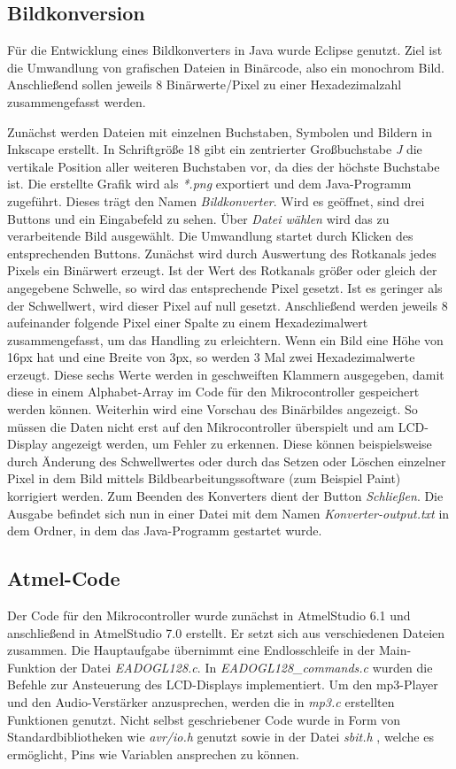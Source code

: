 \documentclass[journal, a4paper]{IEEEtran}
\begin{document}
	\subsection{Bildkonversion}
		\label{sc:Software:subsc:Bildkonverter}
		Für die Entwicklung eines Bildkonverters in Java wurde Eclipse genutzt. Ziel ist die Umwandlung von grafischen Dateien in Binärcode, also ein monochrom Bild. Anschließend sollen jeweils 8 Binärwerte/Pixel zu einer Hexadezimalzahl zusammengefasst werden.\par 
		Zunächst werden Dateien mit einzelnen Buchstaben, Symbolen und Bildern in Inkscape erstellt. In Schriftgröße 18 gibt ein zentrierter Großbuchstabe \textit{J} die vertikale Position aller weiteren Buchstaben vor, da dies der höchste Buchstabe ist. Die erstellte Grafik wird als \textit{*.png} exportiert und dem Java-Programm zugeführt. Dieses trägt den Namen \textit{Bildkonverter}. Wird es geöffnet, sind drei Buttons und ein Eingabefeld zu sehen. Über \textit{Datei wählen} wird das zu verarbeitende Bild ausgewählt. Die Umwandlung startet durch Klicken des entsprechenden Buttons. Zunächst wird durch Auswertung des Rotkanals jedes Pixels ein Binärwert erzeugt. Ist der Wert des Rotkanals größer oder gleich der angegebene Schwelle, so wird das entsprechende Pixel gesetzt. Ist es geringer als der Schwellwert, wird dieser Pixel auf null gesetzt. Anschließend werden jeweils 8 aufeinander folgende Pixel einer Spalte zu einem Hexadezimalwert zusammengefasst, um das Handling zu erleichtern. Wenn ein Bild eine Höhe von 16px hat und eine Breite von 3px, so werden 3 Mal zwei Hexadezimalwerte erzeugt. Diese sechs Werte werden in geschweiften Klammern ausgegeben, damit diese in einem Alphabet-Array im Code für den Mikrocontroller gespeichert werden können. Weiterhin wird eine Vorschau des Binärbildes angezeigt. So müssen die Daten nicht erst auf den Mikrocontroller überspielt und am LCD-Display angezeigt werden, um Fehler zu erkennen. Diese können beispielsweise durch Änderung des Schwellwertes oder durch das Setzen oder Löschen einzelner Pixel in dem Bild mittels Bildbearbeitungssoftware (zum Beispiel Paint) korrigiert werden. Zum Beenden des Konverters dient der Button \textit{Schließen}. Die Ausgabe befindet sich nun in einer Datei mit dem Namen \textit{Konverter-output.txt} in dem Ordner, in dem das Java-Programm gestartet wurde.\par
	\subsection{Atmel-Code}
	\label{sc:Software:subsc:Atmel-Code}
	Der Code für den Mikrocontroller wurde zunächst in AtmelStudio 6.1 und anschließend in AtmelStudio 7.0 erstellt. Er setzt sich aus verschiedenen Dateien zusammen. Die Hauptaufgabe übernimmt eine Endlosschleife in der Main-Funktion der Datei \emph{EADOGL128.c}. In \emph{EADOGL128\_commands.c} wurden die Befehle zur Ansteuerung des LCD-Displays implementiert. Um den mp3-Player und den Audio-Verstärker anzusprechen, werden die in \emph{mp3.c} erstellten Funktionen genutzt. Nicht selbst geschriebener Code wurde in Form von Standardbibliotheken wie \emph{avr/io.h} genutzt sowie in der Datei \emph{sbit.h} \cite{sbit}, welche es ermöglicht, Pins wie Variablen ansprechen zu können.
	
\end{document}
